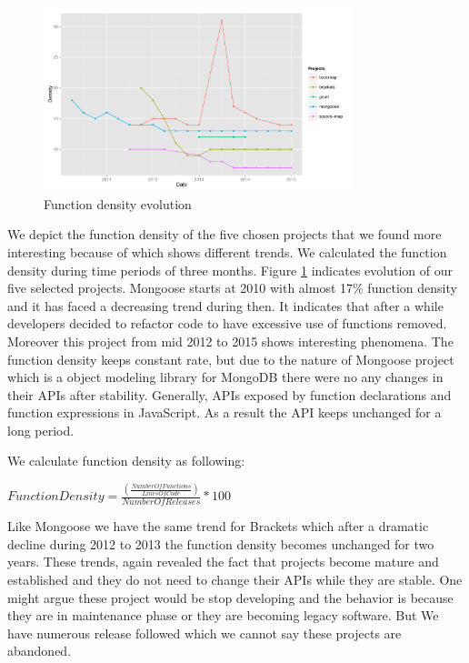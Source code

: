 \begin{figure}[thb!]
 	\caption{Function density evolution}
 	\label{fig:function_density}
 	\includegraphics[width=90mm,scale=0.5]{figures/function_density}
 \end{figure}


We depict the function density of the five chosen projects that we found more interesting because of which shows different trends. We calculated the function density during time periods of three months.
Figure \ref{fig:function_density} indicates evolution of our five selected projects. Mongoose starts at 2010 with almost 17\% function density and it has faced a decreasing trend during then. It indicates that after a while developers decided to refactor code to have  excessive use of functions removed. Moreover this project from mid 2012 to 2015 shows interesting phenomena. The function density keeps constant rate, but due to the nature of Mongoose project which is a object modeling library for MongoDB there were no any changes in their APIs after stability. Generally, APIs exposed by function declarations and function expressions in JavaScript. As a result the API keeps unchanged for a long period. 

\par
We calculate function density as following:

\begin{center}
	$Function Density=  \frac{\left ( \frac{Number Of Functions}{Lines Of Code} \right)}{Number Of Releases}\ast 100$
\end{center}

\par
Like Mongoose we have the same trend for Brackets which after a dramatic decline during 2012 to 2013 the function density becomes unchanged for two years. These trends, again revealed the fact that projects become mature and established and they do not need to change their APIs while they are stable. One might argue these project would be stop developing and the behavior is because they are in maintenance phase or they are becoming legacy software. But We have numerous release followed which we cannot say these projects are abandoned.  

